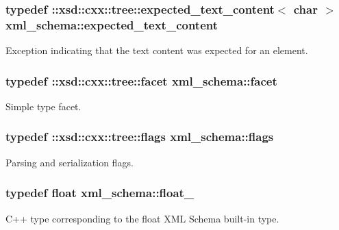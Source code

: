 \subsubsection[{expected\+\_\+text\+\_\+content}]{\setlength{\rightskip}{0pt plus 5cm}typedef \+::xsd\+::cxx\+::tree\+::expected\+\_\+text\+\_\+content$<$ char $>$ {\bf xml\+\_\+schema\+::expected\+\_\+text\+\_\+content}}\label{namespacexml__schema_a1994323b3f5fee8db7891f02bb9144b9}


Exception indicating that the text content was expected for an element. 

\hypertarget{namespacexml__schema_ae447ddf0dd2470b5a095774e0b359a86}{}
\subsubsection[{facet}]{\setlength{\rightskip}{0pt plus 5cm}typedef \+::xsd\+::cxx\+::tree\+::facet {\bf xml\+\_\+schema\+::facet}}\label{namespacexml__schema_ae447ddf0dd2470b5a095774e0b359a86}


Simple type facet. 

\hypertarget{namespacexml__schema_a8d981c127a1f5106d04ad5853e707361}{}
\subsubsection[{flags}]{\setlength{\rightskip}{0pt plus 5cm}typedef \+::xsd\+::cxx\+::tree\+::flags {\bf xml\+\_\+schema\+::flags}}\label{namespacexml__schema_a8d981c127a1f5106d04ad5853e707361}


Parsing and serialization flags. 

\hypertarget{namespacexml__schema_ad7e04ab17bba0b3fdde43fb79ef6ed87}{}
\subsubsection[{float\+\_\+}]{\setlength{\rightskip}{0pt plus 5cm}typedef float {\bf xml\+\_\+schema\+::float\+\_\+}}\label{namespacexml__schema_ad7e04ab17bba0b3fdde43fb79ef6ed87}


C++ type corresponding to the float X\+M\+L Schema built-\/in type. 

\hypertarget{namespacexml__schema_a4beba84e7d1a15ea569cad2c7cc2247a}{}
